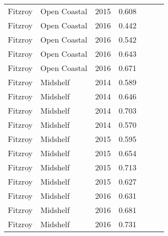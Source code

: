 {\begin{longtable}{llccccc}
  Fitzroy & Open Coastal & 2015 & 0.608 & \cellcolor[HTML]{F0C918}{C} & \cellcolor[HTML]{B0D235}{B} & \cellcolor[HTML]{F0C918}{C} \\ 
  Fitzroy & Open Coastal & 2016 & 0.442 & \cellcolor[HTML]{F47721}{D} & \cellcolor[HTML]{F0C918}{C} & \cellcolor[HTML]{F47721}{D} \\ 
  Fitzroy & Open Coastal & 2016 & 0.542 & \cellcolor[HTML]{F0C918}{C} & \cellcolor[HTML]{F0C918}{C} & \cellcolor[HTML]{F0C918}{C} \\ 
  Fitzroy & Open Coastal & 2016 & 0.643 & \cellcolor[HTML]{F0C918}{C} & \cellcolor[HTML]{B0D235}{B} & \cellcolor[HTML]{F0C918}{C} \\ 
  Fitzroy & Open Coastal & 2016 & 0.671 & \cellcolor[HTML]{B0D235}{B} & \cellcolor[HTML]{B0D235}{B} & \cellcolor[HTML]{B0D235}{B} \\ 
  Fitzroy & Midshelf & 2014 & 0.589 & \cellcolor[HTML]{F0C918}{C} & \cellcolor[HTML]{F0C918}{C} & \cellcolor[HTML]{F0C918}{C} \\ 
  Fitzroy & Midshelf & 2014 & 0.646 & \cellcolor[HTML]{F0C918}{C} & \cellcolor[HTML]{B0D235}{B} & \cellcolor[HTML]{F0C918}{C} \\ 
  Fitzroy & Midshelf & 2014 & 0.703 & \cellcolor[HTML]{B0D235}{B} & \cellcolor[HTML]{B0D235}{B} & \cellcolor[HTML]{B0D235}{B} \\ 
  Fitzroy & Midshelf & 2014 & 0.570 & \cellcolor[HTML]{F0C918}{C} & \cellcolor[HTML]{F0C918}{C} & \cellcolor[HTML]{F0C918}{C} \\ 
  Fitzroy & Midshelf & 2015 & 0.595 & \cellcolor[HTML]{F0C918}{C} & \cellcolor[HTML]{F0C918}{C} & \cellcolor[HTML]{F0C918}{C} \\ 
  Fitzroy & Midshelf & 2015 & 0.654 & \cellcolor[HTML]{F0C918}{C} & \cellcolor[HTML]{B0D235}{B} & \cellcolor[HTML]{B0D235}{B} \\ 
  Fitzroy & Midshelf & 2015 & 0.713 & \cellcolor[HTML]{B0D235}{B} & \cellcolor[HTML]{B0D235}{B} & \cellcolor[HTML]{B0D235}{B} \\ 
  Fitzroy & Midshelf & 2015 & 0.627 & \cellcolor[HTML]{F0C918}{C} & \cellcolor[HTML]{B0D235}{B} & \cellcolor[HTML]{F0C918}{C} \\ 
  Fitzroy & Midshelf & 2016 & 0.631 & \cellcolor[HTML]{F0C918}{C} & \cellcolor[HTML]{B0D235}{B} & \cellcolor[HTML]{F0C918}{C} \\ 
  Fitzroy & Midshelf & 2016 & 0.681 & \cellcolor[HTML]{B0D235}{B} & \cellcolor[HTML]{B0D235}{B} & \cellcolor[HTML]{B0D235}{B} \\ 
  Fitzroy & Midshelf & 2016 & 0.731 & \cellcolor[HTML]{B0D235}{B} & \cellcolor[HTML]{B0D235}{B} & \cellcolor[HTML]{B0D235}{B} \\ 

\end{longtable}}
